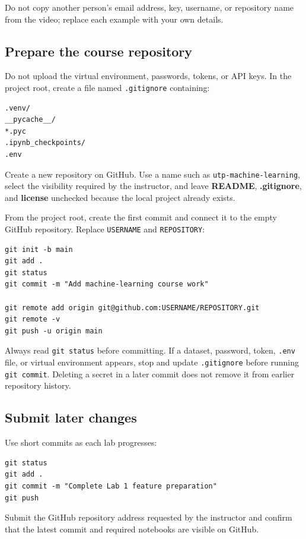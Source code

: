 Do not copy another person's email address, key, username, or repository name from the video; replace each example with your own details.

\subsection{Prepare the course repository}

Do not upload the virtual environment, passwords, tokens, or API keys. In the project root, create a file named \texttt{.gitignore} containing:

\begin{lstlisting}[style=mlterminal]
.venv/
__pycache__/
*.pyc
.ipynb_checkpoints/
.env
\end{lstlisting}

Create a new repository on GitHub. Use a name such as
\texttt{utp-machine-learning}, select the visibility required by the
instructor, and leave \textbf{README}, \textbf{.gitignore}, and
\textbf{license} unchecked because the local project already exists.

From the project root, create the first commit and connect it to the empty
GitHub repository. Replace \texttt{USERNAME} and \texttt{REPOSITORY}:

\begin{lstlisting}[style=mlterminal]
git init -b main
git add .
git status
git commit -m "Add machine-learning course work"

git remote add origin git@github.com:USERNAME/REPOSITORY.git
git remote -v
git push -u origin main
\end{lstlisting}

\begin{pitfall}
Always read \texttt{git status} before committing. If a dataset, password,
token, \texttt{.env} file, or virtual environment appears, stop and update
\texttt{.gitignore} before running \texttt{git commit}. Deleting a secret in a
later commit does not remove it from earlier repository history.
\end{pitfall}

\subsection{Submit later changes}

Use short commits as each lab progresses:

\begin{lstlisting}[style=mlterminal]
git status
git add .
git commit -m "Complete Lab 1 feature preparation"
git push
\end{lstlisting}

Submit the GitHub repository address requested by the instructor and confirm that the latest commit and required notebooks are visible on GitHub.
